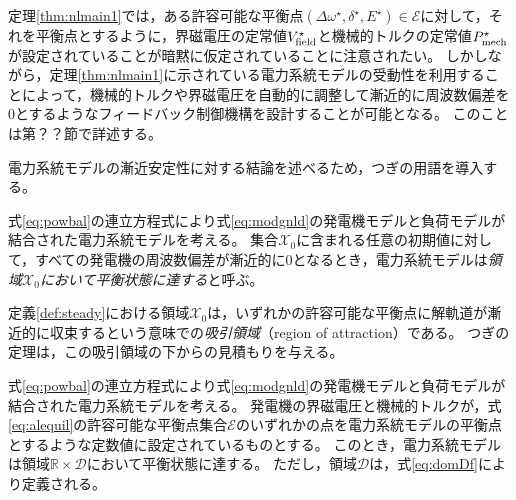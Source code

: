 \documentclass[tombow,dvipdfmx]{corona-a5}
\begin{document}
定理\ref{thm:nlmain1}では，ある許容可能な平衡点$(\Delta \omega^{\star},\delta^{\star},E^{\star}) \in \mathcal{E}$に対して，それを平衡点とするように，界磁電圧の定常値$V_{\rm field}^{\star}$と機械的トルクの定常値$P_{\rm mech}^{\star}$が設定されていることが暗黙に仮定されていることに注意されたい。
しかしながら，定理\ref{thm:nlmain1}に示されている電力系統モデルの受動性を利用することによって，機械的トルクや界磁電圧を自動的に調整して漸近的に周波数偏差を0とするようなフィードバック制御機構を設計することが可能となる。
このことは第？？節で詳述する。

電力系統モデルの漸近安定性に対する結論を述べるため，つぎの用語を導入する。

\begin{定義}\label{def:steady}
式\ref{eq:powbal}の連立方程式により式\ref{eq:modgnld}の発電機モデルと負荷モデルが結合された電力系統モデルを考える。
集合$\mathcal{X}_0$に含まれる任意の初期値に対して，すべての発電機の周波数偏差が漸近的に0となるとき，電力系統モデルは\emph{領域$\mathcal{X}_0$において平衡状態に達する}と呼ぶ。
\end{定義}

定義\ref{def:steady}における領域$\mathcal{X}_0$は，いずれかの許容可能な平衡点に解軌道が漸近的に収束するという意味での\emph{吸引領域}（region of attraction）である。
つぎの定理は，この吸引領域の下からの見積もりを与える。


\begin{定理}\label{thm:nlmain2}
式\ref{eq:powbal}の連立方程式により式\ref{eq:modgnld}の発電機モデルと負荷モデルが結合された電力系統モデルを考える。
発電機の界磁電圧と機械的トルクが，式\ref{eq:alequil}の許容可能な平衡点集合$\mathcal{E}$のいずれかの点を電力系統モデルの平衡点とするような定数値に設定されているものとする。
このとき，電力系統モデルは領域$\mathbb{R}\times \mathcal{D}$において平衡状態に達する。
ただし，領域$\mathcal{D}$は，式\ref{eq:domDf}により定義される。
\end{定理}
\end{document}
